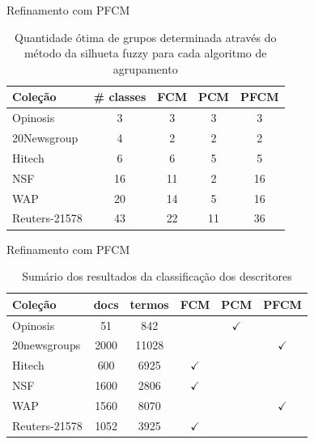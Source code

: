 \documentclass[brazil]{beamer}
\begin{document}
\begin{frame}{Refinamento com PFCM}
\begin{table}[!htp]
  \centering
  \begin{tabular}{ |l|c|c|c|c|}
    \hline
    {\bf Coleção} & {\bf \# classes} & {\bf FCM} & {\bf PCM} & {\bf PFCM} \\
    \hline
    Opinosis & 3 & 3 & 3 & 3 \\
    \hline
    20Newsgroup & 4 & 2 & 2 & 2 \\
    \hline
    Hitech & 6 & 6 & 5 & 5 \\
    \hline
    NSF & 16 & 11 & 2 & 16 \\
    \hline
    WAP & 20 & 14 & 5 & 16 \\
    \hline
    Reuters-21578 & 43 & 22 & 11 & 36 \\
    \hline
  \end{tabular}
  \caption{Quantidade ótima de grupos determinada através do método da silhueta fuzzy para cada
  algoritmo de agrupamento}
  \label{table:pfcmclusters}
\end{table}
\end{frame}

\begin{frame}{Refinamento com PFCM}

  \begin{table}[!htp]
    \centering
    \begin{tabular}{ |l|c c c c c|}
      \hline
      {\bf Coleção} & {\bf docs} & {\bf termos} & {\bf FCM} & {\bf
    PCM} & {\bf PFCM} \\
      \hline
      Opinosis & 51 & 842 &  & $\checkmark$ &  \\
      \hline
      20newsgroups & 2000 & \alert{11028} &  & & $\checkmark$\\
      \hline
      Hitech & 600 & 6925 & $\checkmark$ & & \\
      \hline
      NSF & 1600 & 2806 & $\checkmark$ & & \\
      \hline
      WAP & 1560 & \alert{8070} &  & & $\checkmark$ \\
      \hline
      Reuters-21578 & 1052 & 3925 & $\checkmark$ & & \\
      \hline
    \end{tabular}
    \caption{Sumário dos resultados da classificação dos descritores}
    \label{table:pfcmsummary}
  \end{table}

\end{frame}
\end{document}
